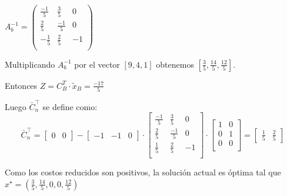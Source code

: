 \documentclass{article}
\begin{document}
\begin{flushleft}
			\(A_b^{-1} = \begin{pmatrix}
			\frac{-1}{5} & \frac{3}{5} & 0 \\
			\frac{2}{5} & \frac{-1}{5} & 0 \\
			-\frac{1}{5} & \frac{2}{5} & -1 \\
			\end{pmatrix}\)
			
			Multiplicando \(A_b^{-1}\) por el vector \([9, 4, 1]\) obtenemos \(\left[\frac{3}{5}, \frac{14}{5}, \frac{12}{5}\right]\).
			\vspace{0,5cm}

			Entonces \( Z = C_B^T \cdot \tilde{x}_B = \frac{-17}{5}\)

			Luego \(\bar{C}_n^\intercal\) se define como:
			\begin{equation*}
				\bar{C}_n^\intercal = 
				\begin{bmatrix}
					0 & 0 
				\end{bmatrix} - 
				\begin{bmatrix}
					-1 & -1 & 0
				\end{bmatrix} \cdot
				\begin{bmatrix}
					\frac{-1}{5} & \frac{3}{5} & 0 \\
					\frac{2}{5} & \frac{-1}{5} & 0 \\
					\frac{1}{5} & \frac{2}{5} & -1 \\
				\end{bmatrix} \cdot
				\begin{bmatrix}
					1 & 0 \\
					0 & 1   \\
					0 & 0  \\
				\end{bmatrix} = 
				\begin{bmatrix}
					\frac{1}{5} & \frac{2}{5}
				\end{bmatrix}
			\end{equation*}

			Como los costos reducidos son positivos, la solución actual es óptima tal que \(x^\star = \left(\frac{3}{5}, \frac{14}{5}, 0, 0, \frac{12}{5}\right)\)





	\end{flushleft}	
\end{document}
